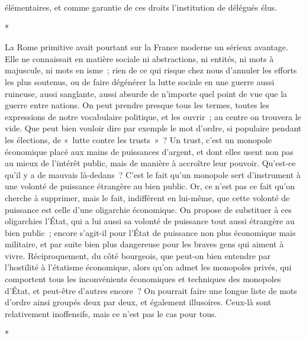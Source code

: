 \documentclass[french,twoside]{book} %
\begin{document}
élémentaires, et comme garantie de ces droits l'institution de délégués élus.\par

\begin{center}
\noindent \centerline{*}\par
\end{center}

\noindent La Rome primitive avait pourtant sur la France moderne un sérieux avantage. Elle ne connaissait en matière sociale ni abstractions, ni entités, ni mots à majuscule, ni mots en isme ; rien de ce qui risque chez nous d'annuler les efforts les plus soutenus, ou de faire dégénérer la lutte sociale en une guerre aussi ruineuse, aussi sanglante, aussi absurde de n'importe quel point de vue que la guerre entre nations. On peut prendre presque tous les termes, toutes les expressions de notre vocabulaire politique, et les ouvrir ; au centre on trouvera le vide. Que peut bien vouloir dire par exemple le mot d'ordre, si populaire pendant les élections, de « lutte contre les trusts » ? Un trust, c'est un monopole économique placé aux mains de puissances d'argent, et dont elles usent non pas au mieux de l'intérêt public, mais de manière à accroître leur pouvoir. Qu'est-ce qu'il y a de mauvais là-dedans ? C'est le fait qu'un monopole sert d'instrument à une volonté de puissance étrangère au bien public. Or, ce n'est pas ce fait qu'on cherche à supprimer, mais le fait, indiffé­rent en lui-même, que cette volonté de puissance est celle d'une oligarchie économique. On propose de substituer à ces oligarchies l'État, qui a lui aussi sa volonté de puissance tout aussi étrangère au bien public ; encore s'agit-il pour l'État de puissance non plus économique mais militaire, et par suite bien plus dangereuse pour les braves gens qui aiment à vivre. Réciproquement, du côté bourgeois, que peut-on bien entendre par l'hostilité à l'étatisme écono­mique, alors qu'on admet les monopoles privés, qui comportent tous les inconvénients économiques et techniques des monopoles d'État, et peut-être d'autres encore ? On pourrait faire une longue liste de mots d'ordre ainsi groupés deux par deux, et également illusoires. Ceux-là sont relativement inoffensifs, mais ce n'est pas le cas pour tous.\par

\begin{center}
\noindent \centerline{*}\par
\end{center}
\end{document}
